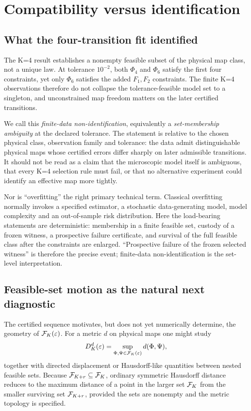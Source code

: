 \section{Compatibility versus identification}
\label{sec:identification}

\subsection{What the four-transition fit identified}

The K=4 result establishes a nonempty feasible subset of the physical map class, not a unique law.  At tolerance $10^{-2}$, both $\Phi_4$ and $\Phi_6$ satisfy the first four constraints, yet only $\Phi_6$ satisfies the added $F_1,F_2$ constraints.  The finite K=4 observations therefore do not collapse the tolerance-feasible model set to a singleton, and unconstrained map freedom matters on the later certified transitions.

We call this \emph{finite-data non-identification}, equivalently a \emph{set-membership ambiguity} at the declared tolerance.  The statement is relative to the chosen physical class, observation family and tolerance: the data admit distinguishable physical maps whose certified errors differ sharply on later admissible transitions.  It should not be read as a claim that the microscopic model itself is ambiguous, that every K=4 selection rule must fail, or that no alternative experiment could identify an effective map more tightly.

Nor is ``overfitting'' the right primary technical term.  Classical overfitting normally invokes a specified estimator, a stochastic data-generating model, model complexity and an out-of-sample risk distribution.  Here the load-bearing statements are deterministic: membership in a finite feasible set, custody of a frozen witness, a prospective failure certificate, and survival of the full feasible class after the constraints are enlarged.  ``Prospective failure of the frozen selected witness'' is therefore the precise event; finite-data non-identification is the set-level interpretation.

\subsection{Feasible-set motion as the natural next diagnostic}

The certified sequence motivates, but does not yet numerically determine, the geometry of $\mathcal F_K(\varepsilon)$.  For a metric $d$ on physical maps one might study
\begin{equation}
D_K^d(\varepsilon)=\sup_{\Phi,\Psi\in\mathcal F_K(\varepsilon)}d(\Phi,\Psi),
\label{eq:diameter-diagnostic}
\end{equation}
together with directed displacement or Hausdorff-like quantities between nested feasible sets.  Because $\mathcal F_{K+r}\subseteq\mathcal F_K$, ordinary symmetric Hausdorff distance reduces to the maximum distance of a point in the larger set $\mathcal F_K$ from the smaller surviving set $\mathcal F_{K+r}$, provided the sets are nonempty and the metric topology is specified.

